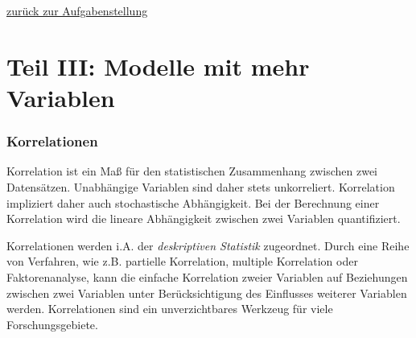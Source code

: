 \documentclass[]{article}
\newenvironment{Shaded}{\begin{snugshade}}{\end{snugshade}}
\newcommand{\KeywordTok}[1]{\textcolor[rgb]{0.13,0.29,0.53}{\textbf{#1}}}
\newcommand{\DataTypeTok}[1]{\textcolor[rgb]{0.13,0.29,0.53}{#1}}
\newcommand{\DecValTok}[1]{\textcolor[rgb]{0.00,0.00,0.81}{#1}}
\newcommand{\StringTok}[1]{\textcolor[rgb]{0.31,0.60,0.02}{#1}}
\newcommand{\CommentTok}[1]{\textcolor[rgb]{0.56,0.35,0.01}{\textit{#1}}}
\newcommand{\OperatorTok}[1]{\textcolor[rgb]{0.81,0.36,0.00}{\textbf{#1}}}
\newcommand{\NormalTok}[1]{#1}
\begin{document}
\begin{Shaded}
\end{Shaded}

\protect\hyperlink{aufgabenstellung-1}{zurück zur Aufgabenstellung}

\part*{Teil III: Modelle mit mehr
Variablen}\label{part-teil-iii-modelle-mit-mehr-variablen}

\section*{Korrelationen}\label{korrelationen}

Korrelation ist ein Maß für den statistischen Zusammenhang zwischen zwei
Datensätzen. Unabhängige Variablen sind daher stets unkorreliert.
Korrelation impliziert daher auch stochastische Abhängigkeit. Bei der
Berechnung einer Korrelation wird die lineare Abhängigkeit zwischen zwei
Variablen quantifiziert.

Korrelationen werden i.A. der \emph{deskriptiven Statistik} zugeordnet.
Durch eine Reihe von Verfahren, wie z.B. partielle Korrelation, multiple
Korrelation oder Faktorenanalyse, kann die einfache Korrelation zweier
Variablen auf Beziehungen zwischen zwei Variablen unter Berücksichtigung
des Einflusses weiterer Variablen werden. Korrelationen sind ein
unverzichtbares Werkzeug für viele Forschungsgebiete.
\end{document}
